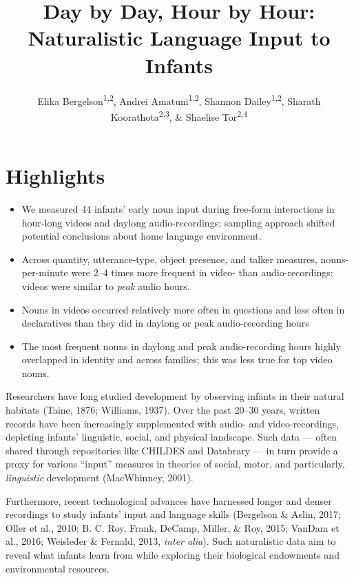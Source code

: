 \documentclass[man]{apa6}
\title{Day by Day, Hour by Hour: Naturalistic Language Input to Infants}
\author{Elika Bergelson\textsuperscript{1,2}, Andrei Amatuni\textsuperscript{1,2}, Shannon Dailey\textsuperscript{1,2}, Sharath Koorathota\textsuperscript{2,3}, \& Shaelise Tor\textsuperscript{2,4}}
\affiliation{
    \vspace{0.5cm}
          \textsuperscript{1} Duke University\\
          \textsuperscript{2} University of Rochester\\
          \textsuperscript{3} Columbia University Medical Center\\
          \textsuperscript{4} Syracuse University  }
\providecommand{\tightlist}{%
  \setlength{\itemsep}{0pt}\setlength{\parskip}{0pt}}
\theoremstyle{definition}
\theoremstyle{definition}
\theoremstyle{definition}
\theoremstyle{remark}
\begin{document}
\maketitle

\setcounter{secnumdepth}{0}



\section{Highlights}\label{highlights}

\begin{itemize}
\tightlist
\item
  We measured 44 infants' early noun input during free-form interactions
  in hour-long videos and daylong audio-recordings; sampling approach
  shifted potential conclusions about home language environment.
\item
  Across quantity, utterance-type, object presence, and talker measures,
  nouns-per-minute were 2--4 times more frequent in video- than
  audio-recordings; videos were similar to \emph{peak} audio hours.
\item
  Nouns in videos occurred relatively more often in questions and less
  often in declaratives than they did in daylong or peak audio-recording
  hours
\item
  The most frequent nouns in daylong and peak audio-recording hours
  highly overlapped in identity and across families; this was less true
  for top video nouns.
\end{itemize}

Researchers have long studied development by observing infants in their
natural habitats (Taine, 1876; Williams, 1937). Over the past 20--30
years, written records have been increasingly supplemented with audio-
and video-recordings, depicting infants' linguistic, social, and
physical landscape. Such data --- often shared through repositories like
CHILDES and Databrary --- in turn provide a proxy for various
\enquote{input} measures in theories of social, motor, and particularly,
\emph{linguistic} development (MacWhinney, 2001).

Furthermore, recent technological advances have harnessed longer and
denser recordings to study infants' input and language skills (Bergelson
\& Aslin, 2017; Oller et al., 2010; B. C. Roy, Frank, DeCamp, Miller, \&
Roy, 2015; VanDam et al., 2016; Weisleder \& Fernald, 2013, \emph{inter
alia}). Such naturalistic data aim to reveal what infants learn from
while exploring their biological endowments and environmental resources.
\end{document}
